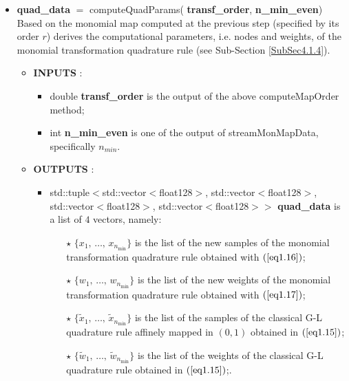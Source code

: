 \documentclass[a4paper, twosided]{book}
\begin{document}
\begin{itemize}
    \item \color{poliDarkBlue} \textbf{quad\_data} \color{black} $=$ \colorbox{poliGrayBlue}{computeQuadParams}(\color{poliDarkBlue} \textbf{transf\_order}\color{black}, \color{poliDarkBlue} \textbf{n\_min\_even}\color{black})
    \newline Based on the monomial map computed at the previous step (specified by its order $r$) derives the computational parameters, i.e. nodes and weights, of the monomial transformation quadrature rule (see Sub-Section \ref{SubSec4.1.4}).
    \begin{itemize}
        \item \color{poliDarkBlue} \textbf{INPUTS} \color{black}:
        \begin{itemize}
            \item \colorbox{poliGrayBlue}{double} \color{poliDarkBlue} \textbf{transf\_order} \color{black} is the output of the above \colorbox{poliGrayBlue}{computeMapOrder} method;
            \item \colorbox{poliGrayBlue}{int} \color{poliDarkBlue} \textbf{n\_min\_even} \color{black} is one of the output of \colorbox{poliGrayBlue}{streamMonMapData}, specifically $n_{min}$.
        \end{itemize}
        \item \color{poliDarkBlue} \textbf{OUTPUTS} \color{black}:
        \begin{itemize}
            \item \colorbox{poliGrayBlue}{std::tuple$<$std::vector$<$float128$>$, std::vector$<$float128$>$, std::vector$<$float128$>$, std::vector$<$float128$>>$} \color{poliDarkBlue} \textbf{quad\_data} \color{black} is a list of $4$ vectors, namely:
            \begin{itemize}
                \item[\color{poliDarkBlue} $\star$] $\{x_1,\,\dots,\,x_{n_{\text{min}}}\}$ is the list of the new samples of the monomial transformation quadrature rule obtained with $(\ref{eq1.16})$;
                \item[\color{poliDarkBlue} $\star$] $\{w_1,\,\dots,\,w_{n_{\text{min}}}\}$ is the list of the new weights of the monomial transformation quadrature rule obtained with $(\ref{eq1.17})$;
                \item[\color{poliDarkBlue} $\star$] $\{\tilde{x}_1,\,\dots,\,\tilde{x}_{n_{\text{min}}}\}$ is the list of the samples of the classical G-L quadrature rule affinely mapped in $(0,1)$ obtained in $(\ref{eq1.15})$;
                \item[\color{poliDarkBlue} $\star$] $\{\tilde{w}_1,\,\dots,\,\tilde{w}_{n_{\text{min}}}\}$ is the list of the weights of the classical G-L quadrature rule obtained in $(\ref{eq1.15})$;.
            \end{itemize}
        \end{itemize}
    \end{itemize}
    

\end{itemize}
\end{document}
